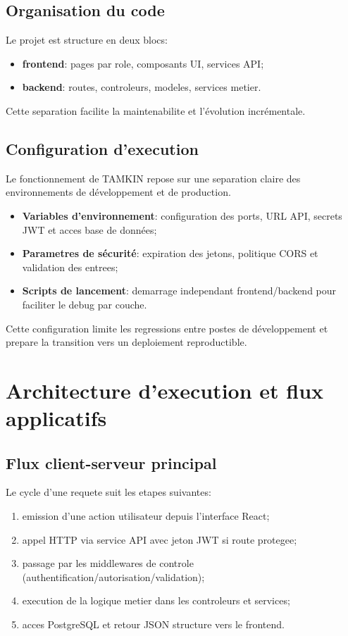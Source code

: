 \documentclass[12pt,a4paper,oneside]{report}
\begin{document}
\subsection{Organisation du code}

Le projet est structure en deux blocs:
\begin{itemize}
  \item \textbf{frontend}: pages par role, composants UI, services API;
  \item \textbf{backend}: routes, controleurs, modeles, services metier.
\end{itemize}

Cette separation facilite la maintenabilite et l'évolution incrémentale.

\subsection{Configuration d'execution}

Le fonctionnement de TAMKIN repose sur une separation claire des environnements de développement et de production.
\begin{itemize}
  \item \textbf{Variables d'environnement}: configuration des ports, URL API, secrets JWT et acces base de données;
  \item \textbf{Parametres de sécurité}: expiration des jetons, politique CORS et validation des entrees;
  \item \textbf{Scripts de lancement}: demarrage independant frontend/backend pour faciliter le debug par couche.
\end{itemize}

Cette configuration limite les regressions entre postes de développement et prepare la transition vers un deploiement reproductible.

\section{Architecture d'execution et flux applicatifs}

\subsection{Flux client-serveur principal}

Le cycle d'une requete suit les etapes suivantes:
\begin{enumerate}
  \item emission d'une action utilisateur depuis l'interface React;
  \item appel HTTP via service API avec jeton JWT si route protegee;
  \item passage par les middlewares de controle (authentification/autorisation/validation);
  \item execution de la logique metier dans les controleurs et services;
  \item acces PostgreSQL et retour JSON structure vers le frontend.
\end{enumerate}
\end{document}
